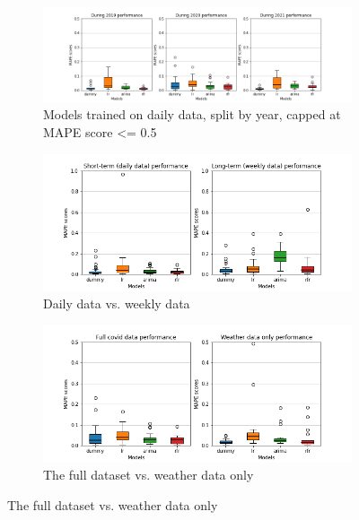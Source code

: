 \begin{figure}
\centering
\begin{subfigure}[b]{.6\linewidth}
    \includegraphics[width=\linewidth]{thesis/images/plots/daily_2019_vs_2020_vs_2021_max_05.png}
    \caption{Models trained on daily data, split by year, capped at MAPE score <= 0.5}
    \label{fig:yearplot}
\end{subfigure}
\begin{subfigure}[b]{.4\linewidth}
    \includegraphics[width=\linewidth]{thesis/images/plots/base_model_comparison_daily_weekly.png}
    \caption{Daily data vs. weekly data}
    \label{fig:modelcompare}
\end{subfigure}
\begin{subfigure}[b]{.4\linewidth}
    \includegraphics[width=\linewidth]{thesis/images/plots/daily_full_covid_data_vs_weather_data_only_max_05.png}
    \caption{The full dataset vs. weather data only}
    \label{fig:weathervfull}
\end{subfigure}


\end{figure}
